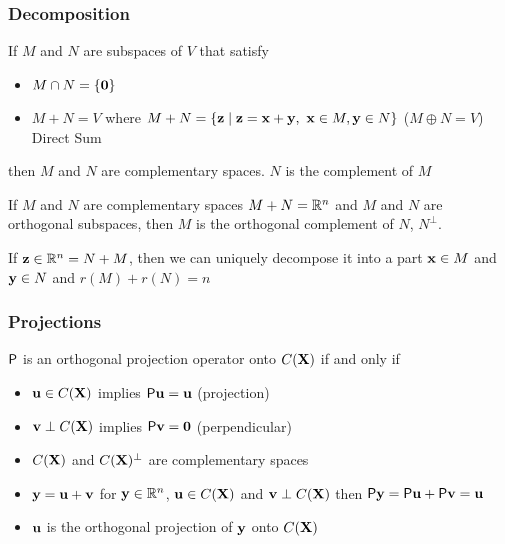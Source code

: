 \documentclass[handout]{beamer}
\begin{document}
\begin{frame}
  \frametitle{Decomposition}
  \begin{definition}
    If $M$ and $N$ are subspaces of $V$ that satisfy
    \begin{itemize}
    \item $M \cap N = \{ \zero \}$ \pause
    \item $M + N = V$ where $M+N = \{ \z \mid \z = \x + \y, \  \x \in
      M, \y \in N\}$  ($M \oplus N = V$) Direct Sum \pause
    \end{itemize}
then $M$ and $N$ are complementary spaces. \pause  $N$ is the
complement of $M$ \pause
\end{definition}
\begin{definition}
  If $M$ and $N$ are complementary spaces $M + N =\bbR^n$ and $M$ and
  $N$ are orthogonal subspaces, then $M$ is the orthogonal complement of
  $N$, $N^{\perp}$. 
\end{definition} \pause If $\z\in \bbR^n = N+M$, then we can uniquely
decompose it into a part $\x \in M$ and $\y \in N$ and $r(M) + r(N) =
n$
\end{frame}
\begin{frame} \frametitle{Projections}
\begin{definition}
$\P$ is an orthogonal projection operator onto $C(\X)$ if and only if \pause
  \begin{itemize}
  \item $\u \in C(\X)$ implies $\P \u = \u$ (projection) \pause
  \item $\v \perp C(\X)$ implies $\P \v = \zero$ (perpendicular) \pause
  \end{itemize}
\end{definition} 
\begin{itemize}
\item $C(\X)$ and $C(\X)^\perp$ are complementary spaces \pause
\item $\y = \u + \v$ for $\y \in \bbR^n$, $\u \in C(\X)$ and $\v \perp
  C(\X)$  then $\P \y = \P \u + \P \v = \u$ \pause
\item $\u$ is the orthogonal projection of $\y$ onto $C(\X)$

\end{itemize}



\end{frame}
\end{document}
